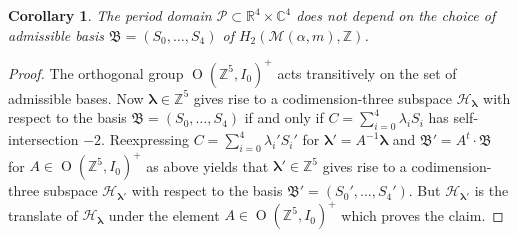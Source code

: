 \documentclass[12pt,letterpaper,reqno]{amsart}
\def\bm#1{#1}%
\def\mathbf#1{#1}%
\newtheorem{cor}[thm]{Corollary}
\theoremstyle{remark}
\theoremstyle{definition}
\numberwithin{thm}{section}
\numberwithin{equation}{section}
\numberwithin{figure}{section}
\newcommand{\R}{\ensuremath{\mathbb R}}
\newcommand{\C}{\ensuremath{\mathbb C}}
\newcommand{\Z}{\ensuremath{\mathbb Z}}
\newcommand{\bfalpha}{\ensuremath{\bm \alpha}}
\newcommand{\calP}{\mathcal P}
\newcommand{\bfm}{\mathbf{m}}
\DeclareMathOperator{\OO}{O}
\begin{document}
\begin{cor}
The period domain $\calP \subset \R^4 \times \C^4$ does not depend on the choice of admissible basis $\mathfrak{B}=(S_0, \ldots, S_4)$ of $H_2(\mathcal{M}(\bfalpha,\bfm),\Z)$.
\end{cor}

\begin{proof}
	The orthogonal group $\OO(\Z^5, I_0)^+$ acts transitively on the set of admissible bases. Now $\boldsymbol{\lambda} \in \Z^5$ gives rise to a codimension-three subspace $\mathcal{H}_{\boldsymbol{\lambda}}$ with respect to the basis $\mathfrak{B}=(S_0, \ldots, S_4)$ if and only if $C = \sum_{i=0}^4 \lambda_iS_i$ has self-intersection $-2$. Reexpressing $C = \sum_{i=0}^4 \lambda_i'S_i'$ for $\boldsymbol{\lambda}'  = A^{-1} \boldsymbol{\lambda}$ and $\mathfrak{B}'=A^t \cdot \mathfrak{B}$ for $A \in \OO(\Z^5, I_0)^+$ as above yields that $\boldsymbol{\lambda}' \in \Z^5$ gives rise to a codimension-three subspace $\mathcal{H}_{\boldsymbol{\lambda}'}$ with respect to the basis $\mathfrak{B}'=(S_0', \ldots, S_4')$. But $\mathcal{H}_{\boldsymbol{\lambda}'}$ is the translate of $\mathcal{H}_{\boldsymbol{\lambda}}$ under the element $A \in \OO(\Z^5, I_0)^+$ which proves the claim.
		\end{proof}
\end{document}
